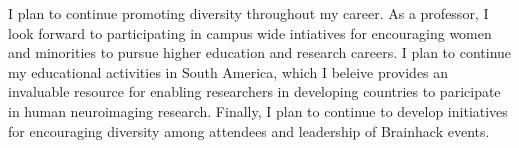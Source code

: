 \documentclass[letterpaper,11pt]{article}
\begin{document}
I plan to continue promoting diversity throughout my career. As a professor, I look forward to participating in campus wide intiatives for encouraging women and minorities to pursue higher education and research careers. I plan to continue my educational activities in South America, which I beleive provides an invaluable resource for enabling researchers in developing countries to paricipate in human neuroimaging research. Finally, I plan to continue to develop initiatives for encouraging diversity among attendees and leadership of Brainhack events.
\end{document}
